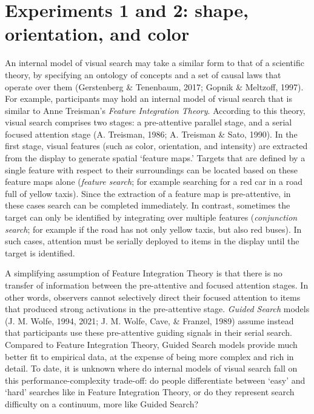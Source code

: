 \documentclass[12pt,twoside]{reedthesis}
\begin{document}
\hypertarget{experiments-1-and-2-shape-orientation-and-color}{%
\section{Experiments 1 and 2: shape, orientation, and color}\label{experiments-1-and-2-shape-orientation-and-color}}

An internal model of visual search may take a similar form to that of a scientific theory, by specifying an ontology of concepts and a set of causal laws that operate over them (Gerstenberg \& Tenenbaum, 2017; Gopnik \& Meltzoff, 1997). For example, participants may hold an internal model of visual search that is similar to Anne Treisman's \emph{Feature Integration Theory}. According to this theory, visual search comprises two stages: a pre-attentive parallel stage, and a serial focused attention stage (A. Treisman, 1986; A. Treisman \& Sato, 1990). In the first stage, visual features (such as color, orientation, and intensity) are extracted from the display to generate spatial `feature maps.' Targets that are defined by a single feature with respect to their surroundings can be located based on these feature maps alone (\emph{feature search}; for example searching for a red car in a road full of yellow taxis). Since the extraction of a feature map is pre-attentive, in these cases search can be completed immediately. In contrast, sometimes the target can only be identified by integrating over multiple features (\emph{conjunction search}; for example if the road has not only yellow taxis, but also red buses). In such cases, attention must be serially deployed to items in the display until the target is identified.

A simplifying assumption of Feature Integration Theory is that there is no transfer of information between the pre-attentive and focused attention stages. In other words, observers cannot selectively direct their focused attention to items that produced strong activations in the pre-attentive stage. \emph{Guided Search} models (J. M. Wolfe, 1994, 2021; J. M. Wolfe, Cave, \& Franzel, 1989) assume instead that participants use these pre-attentive guiding signals in their serial search. Compared to Feature Integration Theory, Guided Search models provide much better fit to empirical data, at the expense of being more complex and rich in detail. To date, it is unknown where do internal models of visual search fall on this performance-complexity trade-off: do people differentiate between `easy' and `hard' searches like in Feature Integration Theory, or do they represent search difficulty on a continuum, more like Guided Search?
\end{document}
